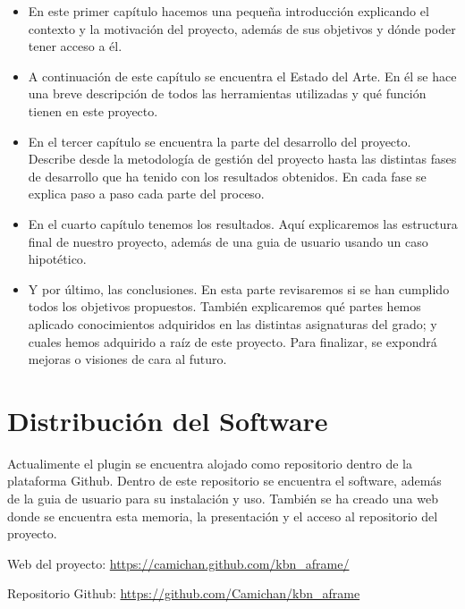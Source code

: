 \documentclass[a4paper, 12pt]{book}
\begin{document}
\begin{itemize}
    \item En este primer capítulo hacemos una pequeña introducción explicando el contexto y la motivación del proyecto, además de sus objetivos y dónde poder tener acceso a él.
    \item A continuación de este capítulo se encuentra el Estado del Arte. En él se hace una breve descripción de todos las herramientas utilizadas y qué función tienen en este proyecto.
    \item En el tercer capítulo se encuentra la parte del desarrollo del proyecto. Describe desde la metodología de gestión del proyecto hasta las distintas fases de desarrollo que ha tenido con los resultados obtenidos. En cada fase se explica paso a paso cada parte del proceso.
    \item En el cuarto capítulo tenemos los resultados. Aquí explicaremos las estructura final de nuestro proyecto, además de una guia de usuario usando un caso hipotético.
    \item Y por último, las conclusiones. En esta parte revisaremos si se han cumplido todos los objetivos propuestos. También explicaremos qué partes hemos aplicado conocimientos adquiridos en las distintas asignaturas del grado; y cuales hemos adquirido a raíz de este proyecto. Para finalizar, se expondrá mejoras o visiones de cara al futuro.
\end{itemize}



\section{Distribución del Software}
\label{sec:distribucion}

Actualimente el plugin se encuentra alojado como repositorio dentro de la plataforma Github. Dentro de este repositorio se encuentra el software, además de la guia de usuario para su instalación y uso. También se ha creado una web donde se encuentra esta memoria, la presentación y el acceso al repositorio del proyecto.

Web del proyecto: \url{https://camichan.github.com/kbn_aframe/}

Repositorio Github: \url{https://github.com/Camichan/kbn_aframe}



\cleardoublepage
\end{document}
